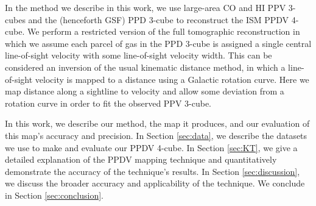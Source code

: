 In the method we describe in this work, we use large-area CO and HI PPV 3-cubes and the \citet{Green_2015} (henceforth GSF) PPD 3-cube to reconstruct the ISM PPDV 4-cube. We perform a restricted version of the full tomographic reconstruction in which we assume each parcel of gas in the PPD 3-cube is assigned a single central line-of-sight velocity with some line-of-sight velocity width. This can be considered an inversion of the usual kinematic distance method, in which a line-of-sight velocity is mapped to a distance using a Galactic rotation curve. Here we map distance along a sightline to velocity and allow some deviation from a rotation curve in order to fit the observed PPV 3-cube.

In this work, we describe our method, the map it produces, and our evaluation of this map's accuracy and precision.
In Section \ref{sec:data}, we describe the datasets we use to make and evaluate our PPDV 4-cube.
In Section \ref{sec:KT}, we give a detailed explanation of the PPDV mapping technique and quantitatively demonstrate the accuracy of the technique's results.
In Section \ref{sec:discussion}, we discuss the broader accuracy and applicability of the technique.
We conclude in Section \ref{sec:conclusion}.
